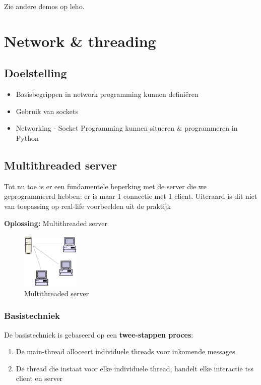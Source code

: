 \documentclass{article}
\begin{document}
Zie andere demos op leho.

\section{Network \& threading}

\subsection{Doelstelling}

\begin{itemize}
    \item Basisbegrippen in network programming kunnen definiëren
    \item Gebruik van sockets
    \item Networking - Socket Programming kunnen situeren \& programmeren in Python
\end{itemize}

\subsection{Multithreaded server}

Tot nu toe is er een fundamentele beperking met de server die we geprogrammeerd hebben:
er is maar 1 connectie met 1 client. Uiteraard is dit niet van toepassing op real-life voorbeelden uit de praktijk

\textbf{Oplossing:} Multithreaded server

\begin{figure}[H]
    \centering
    \includegraphics[width=0.25\textwidth]{multithreaded-server.png}
    \caption{Multithreaded server}
\end{figure}

\subsubsection{Basistechniek}

De basistechniek is gebaseerd op een \textbf{twee-stappen proces}:

\begin{enumerate}
    \item De main-thread alloceert individuele threads voor inkomende messages
    \item De thread die instaat voor elke individuele thread, handelt elke interactie tss client en server
\end{enumerate}
\end{document}
